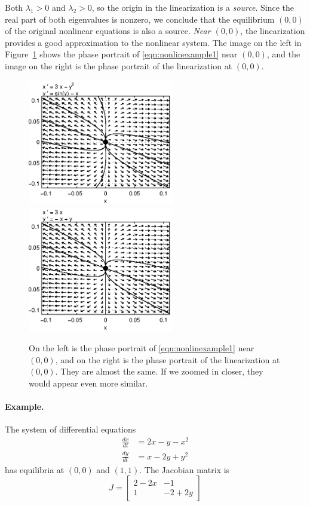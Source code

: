 \documentclass{book}
\begin{document}
Both $\lambda_1>0$ and $\lambda_2>0$, so the origin
in the linearization is a \emph{source}.
Since the real part of both eigenvalues is nonzero,
we conclude that the equilibrium $(0,0)$ of the original
nonlinear equations is also a source.
\emph{Near $(0,0)$}, the linearization provides a
good approximation to the nonlinear system.
The image on the left in Figure~\ref{fig:nonlinexample1compare}
shows the phase portrait of \eqref{eqn:nonlinexample1}
near $(0,0)$, and the image on the right
is the phase portrait of the linearization at $(0,0)$.
\begin{figure}
\centerline{%
\includegraphics[width=2.5in]{pplane_plots/NonlinExample1detail.ps}
\includegraphics[width=2.5in]{pplane_plots/NonlinExample1lin.ps}
}
\caption{On the left is the phase portrait of
\eqref{eqn:nonlinexample1} near $(0,0)$, and on the
right is the phase portrait of the linearization
at $(0,0)$.  They are almost the same.  If we zoomed
in closer, they would appear even more similar.}
\label{fig:nonlinexample1compare}
\end{figure}
%
%
\paragraph{Example.}
The system of differential equations
\begin{equation}
\begin{split}
  \frac{dx}{dt} & = 2x - y -x^2 \\
  \frac{dy}{dt} & = x - 2y + y^2
\end{split}
\end{equation}
has equilibria at $(0,0)$ and $(1,1)$.
The Jacobian matrix is
\begin{equation}
  J = \begin{bmatrix}
           2-2x & -1 \\
	   1 & -2 + 2y
      \end{bmatrix}
\end{equation}
\end{document}
